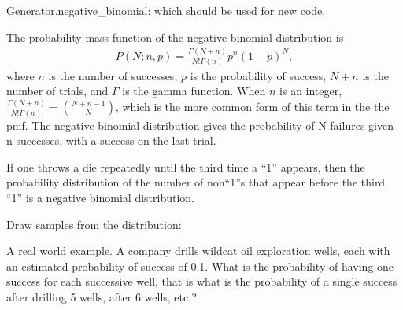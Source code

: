 \documentclass[letterpaper,10pt,english]{sphinxmanual}
\begin{document}
\begin{fulllineitems}
\begin{description}
\end{description}

Generator.negative\_binomial: which should be used for new code.

The probability mass function of the negative binomial distribution is
\begin{equation*}
\begin{split}P(N;n,p) = \frac{\Gamma(N+n)}{N!\Gamma(n)}p^{n}(1-p)^{N},\end{split}
\end{equation*}
where \(n\) is the number of successes, \(p\) is the
probability of success, \(N+n\) is the number of trials, and
\(\Gamma\) is the gamma function. When \(n\) is an integer,
\(\frac{\Gamma(N+n)}{N!\Gamma(n)} = \binom{N+n-1}{N}\), which is
the more common form of this term in the the pmf. The negative
binomial distribution gives the probability of N failures given n
successes, with a success on the last trial.

If one throws a die repeatedly until the third time a “1” appears,
then the probability distribution of the number of non\sphinxhyphen{}“1”s that
appear before the third “1” is a negative binomial distribution.

Draw samples from the distribution:

A real world example. A company drills wild\sphinxhyphen{}cat oil
exploration wells, each with an estimated probability of
success of 0.1.  What is the probability of having one success
for each successive well, that is what is the probability of a
single success after drilling 5 wells, after 6 wells, etc.?

\begin{sphinxVerbatim}[commandchars=\\\{\}]
    
     
       
     
\end{sphinxVerbatim}

\end{fulllineitems}
\end{document}
